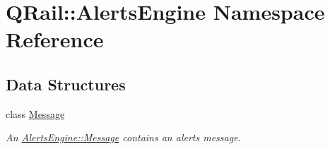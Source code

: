 \hypertarget{namespaceQRail_1_1AlertsEngine}{}\section{Q\+Rail\+::Alerts\+Engine Namespace Reference}
\label{namespaceQRail_1_1AlertsEngine}
\subsection*{Data Structures}
\begin{DoxyCompactItemize}
\item 
class \mbox{\hyperlink{classQRail_1_1AlertsEngine_1_1Message}{Message}}
\begin{DoxyCompactList}\small\item\em An \mbox{\hyperlink{classQRail_1_1AlertsEngine_1_1Message}{Alerts\+Engine\+::\+Message}} contains an alerts message. \end{DoxyCompactList}\end{DoxyCompactItemize}
